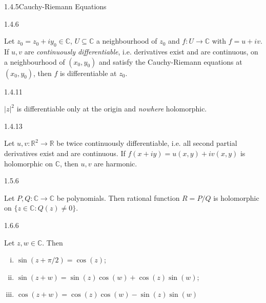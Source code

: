 \documentclass[10pt,landscape]{article}
\begin{document}
\begin{multicols}{3}
\begin{theorem}{1.4.5}{Cauchy-Riemann Equations}
\end{theorem}

%
\begin{theorem}{1.4.6}{}

    Let $z_0 = z_0 + iy_0 \in \mathbb{C}$, $U \subseteq \mathbb{C}$ a neighbourhood of $z_0$ and $f: U \to \mathbb{C}$ with $f = u + iv$. If $u,v$ are \emph{continuously differentiable}, i.e. derivatives exist and are continuous, on a neighbourhood of $(x_0,y_0)$ and satisfy the Cauchy-Riemann equations at $(x_0,y_0)$, then $f$ is differentiable at $z_0$.

\end{theorem}

\begin{example}{1.4.11}{}

    $|z|^2$ is differentiable only at the origin and \emph{nowhere} holomorphic.

\end{example}

\begin{lemma}{1.4.13}{}

    Let $u,v: \mathbb{R}^2 \to \mathbb{R}$ be twice continuously differentiable, i.e. all second partial derivatives exist and are continuous. If $f(x + iy) = u(x,y) + iv(x,y)$ is holomorphic on $\mathbb{C}$, then $u,v$ are harmonic.

\end{lemma}

\begin{lemma}{1.5.6}{}

    Let $P,Q: \mathbb{C} \to \mathbb{C}$ be polynomials. Then rational function $R = P/Q$ is holomorphic on $\{z \in \mathbb{C}: Q(z) \neq 0\}$.

\end{lemma}

\begin{lemma}{1.6.6}{}

    Let $z,w \in \mathbb{C}$. Then

        \begin{enumerate}[(i)]
            \setlength{\parskip}{0em}
            \item $\sin(z + \pi/2) = \cos(z)$;
            \item $\sin(z + w) = \sin(z)\cos(w) + \cos(z)\sin(w)$;
            \item $\cos(z + w) = \cos(z)\cos(w) - \sin(z)\sin(w)$
        \end{enumerate}


\end{lemma}
\end{multicols}
\end{document}

